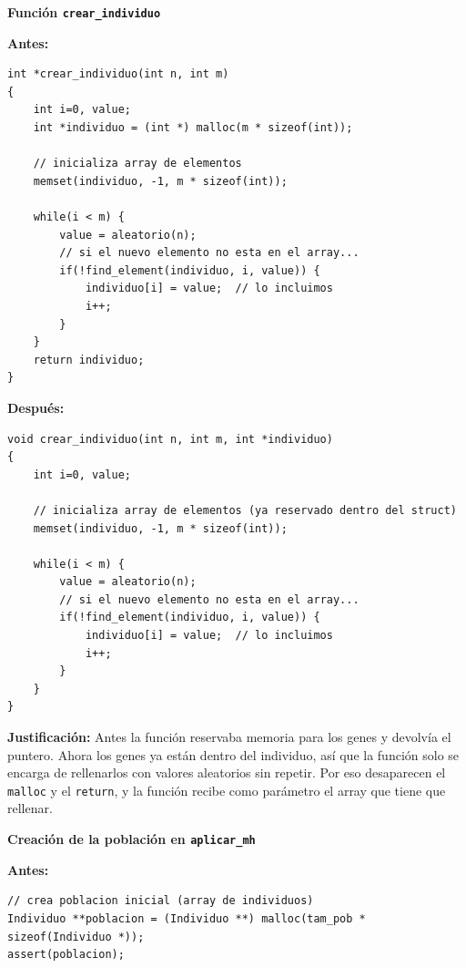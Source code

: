 \documentclass[12pt]{article}
\begin{document}
\begin{enumerate}
\vspace{0.5cm}


\medskip
\noindent\textbf{Función \texttt{crear\_individuo}}\par
\smallskip

\noindent\textbf{Antes:}
\begin{lstlisting}[style=EstiloC]
int *crear_individuo(int n, int m)
{
    int i=0, value;
    int *individuo = (int *) malloc(m * sizeof(int));

    // inicializa array de elementos
    memset(individuo, -1, m * sizeof(int));

    while(i < m) {
        value = aleatorio(n);
        // si el nuevo elemento no esta en el array...
        if(!find_element(individuo, i, value)) {
            individuo[i] = value;  // lo incluimos
            i++;
        }
    }
    return individuo;
}
\end{lstlisting}

\noindent\textbf{Después:}
\begin{lstlisting}[style=EstiloC]
void crear_individuo(int n, int m, int *individuo)
{
    int i=0, value;

    // inicializa array de elementos (ya reservado dentro del struct)
    memset(individuo, -1, m * sizeof(int));

    while(i < m) {
        value = aleatorio(n);
        // si el nuevo elemento no esta en el array...
        if(!find_element(individuo, i, value)) {
            individuo[i] = value;  // lo incluimos
            i++;
        }
    }
}
\end{lstlisting}

\textbf{Justificación:} Antes la función reservaba memoria para los genes y devolvía el puntero. Ahora los genes ya están dentro del individuo, así que la función solo se encarga de rellenarlos con valores aleatorios sin repetir. Por eso desaparecen el \texttt{malloc} y el \texttt{return}, y la función recibe como parámetro el array que tiene que rellenar.

\vspace{0.5cm}



\medskip
\noindent\textbf{Creación de la población en \texttt{aplicar\_mh}}\par
\smallskip

\noindent\textbf{Antes:}
\begin{lstlisting}[style=EstiloC]
// crea poblacion inicial (array de individuos)
Individuo **poblacion = (Individuo **) malloc(tam_pob * sizeof(Individuo *));
assert(poblacion);


\end{lstlisting}
\end{enumerate}
\end{document}
